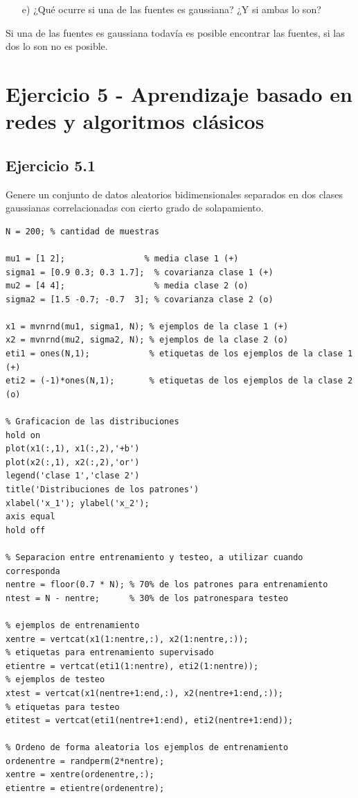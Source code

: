 \documentclass[11pt,a4paper,final]{article}
\begin{document}
\begin{enumerate}

   \item[e)]  ¿Qué ocurre si una de las fuentes es gaussiana? ¿Y si ambas lo son?
\end{enumerate}

Si una de las fuentes es gaussiana todavía es posible encontrar las fuentes, si las dos lo son no es posible.

\clearpage





\section{Ejercicio 5 - Aprendizaje basado en redes y algoritmos clásicos}

\subsection{Ejercicio 5.1}

Genere un conjunto de datos aleatorios bidimensionales separados en dos clases gaussianas correlacionadas con cierto grado de solapamiento.

\begin{verbatim}
N = 200; % cantidad de muestras

mu1 = [1 2];                % media clase 1 (+)
sigma1 = [0.9 0.3; 0.3 1.7];  % covarianza clase 1 (+)
mu2 = [4 4];                  % media clase 2 (o)
sigma2 = [1.5 -0.7; -0.7  3]; % covarianza clase 2 (o)

x1 = mvnrnd(mu1, sigma1, N); % ejemplos de la clase 1 (+)
x2 = mvnrnd(mu2, sigma2, N); % ejemplos de la clase 2 (o)
eti1 = ones(N,1);            % etiquetas de los ejemplos de la clase 1 (+)
eti2 = (-1)*ones(N,1);       % etiquetas de los ejemplos de la clase 2 (o)

% Graficacion de las distribuciones
hold on
plot(x1(:,1), x1(:,2),'+b')
plot(x2(:,1), x2(:,2),'or')
legend('clase 1','clase 2')
title('Distribuciones de los patrones')
xlabel('x_1'); ylabel('x_2');
axis equal
hold off

% Separacion entre entrenamiento y testeo, a utilizar cuando corresponda
nentre = floor(0.7 * N); % 70% de los patrones para entrenamiento
ntest = N - nentre;      % 30% de los patronespara testeo

% ejemplos de entrenamiento
xentre = vertcat(x1(1:nentre,:), x2(1:nentre,:));
% etiquetas para entrenamiento supervisado
etientre = vertcat(eti1(1:nentre), eti2(1:nentre));
% ejemplos de testeo
xtest = vertcat(x1(nentre+1:end,:), x2(nentre+1:end,:));
% etiquetas para testeo
etitest = vertcat(eti1(nentre+1:end), eti2(nentre+1:end));

% Ordeno de forma aleatoria los ejemplos de entrenamiento
ordenentre = randperm(2*nentre);
xentre = xentre(ordenentre,:);
etientre = etientre(ordenentre);
\end{verbatim}
\end{document}
